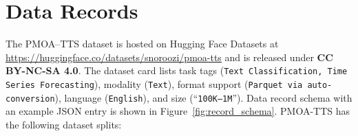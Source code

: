 \documentclass[pdflatex,sn-mathphys-num]{sn-jnl}%
\theoremstyle{thmstyleone}%
\theoremstyle{thmstyletwo}%
\theoremstyle{thmstylethree}%
\begin{document}



\section{Data Records}
\label{sec:data-records}

The PMOA–TTS dataset is hosted on Hugging Face Datasets at \url{https://huggingface.co/datasets/snoroozi/pmoa-tts} and is released under \textbf{CC BY-NC-SA 4.0}. The dataset card lists task tags (\texttt{Text Classification, Time Series Forecasting}), modality (\texttt{Text}), format support (\texttt{Parquet via auto-conversion}), language (\texttt{English}), and size (“\texttt{100K–1M}”). Data record schema with an example JSON entry is shown in Figure~\ref{fig:record_schema}. PMOA-TTS has the following dataset splits: 


\end{document}
